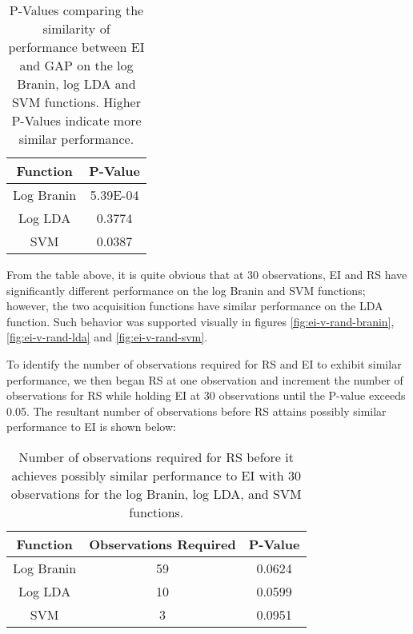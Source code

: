 \documentclass[11pt]{article}
\numberwithin{equation}{section}
\begin{document}
\begin{table}[H]
  \centering
  \begin{tabular}{| c | c |}
    \hline
    Function & P-Value  \\
    \hline
    Log Branin   & 5.39E-04 \\
    \hline
    Log LDA      & 0.3774   \\
    \hline
    SVM      & 0.0387   \\
    \hline
  \end{tabular}
  \caption{P-Values comparing the similarity of performance between EI and GAP on the log Branin, log LDA and SVM functions. Higher P-Values indicate more similar performance.}
  \label{tab:ei-rs-pvals}
\end{table}

From the table above, it is quite obvious that at 30 observations, EI and RS have significantly different performance on the log Branin and SVM functions; however, the two acquisition functions have similar performance on the LDA function. Such behavior was supported visually in figures \ref{fig:ei-v-rand-branin}, \ref{fig:ei-v-rand-lda} and \ref{fig:ei-v-rand-svm}.

To identify the number of observations required for RS and EI to exhibit similar performance, we then began RS at one observation and increment the number of observations for RS while holding EI at 30 observations until the P-value exceeds 0.05. The resultant number of observations before RS attains possibly similar performance to EI is shown below:

\begin{table}[H]
  \centering
  \begin{tabular}{| c | c | c |}
    \hline
    Function & Observations Required & P-Value \\
    \hline
    Log Branin & 59 & 0.0624 \\
    \hline
    Log LDA & 10 & 0.0599 \\
    \hline
    SVM & 3 & 0.0951 \\
    \hline
  \end{tabular}
  \caption{Number of observations required for RS before it achieves possibly similar performance to EI with 30 observations for the log Branin, log LDA, and SVM functions.}
  \label{tab:ei-rs-pvals-to-equivalence}
\end{table}
\end{document}
